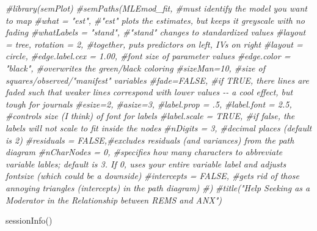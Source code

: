 \documentclass[
  english,
]{book}
\newenvironment{Shaded}{\begin{snugshade}}{\end{snugshade}}
\newcommand{\CommentTok}[1]{\textcolor[rgb]{0.56,0.35,0.01}{\textit{#1}}}
\newcommand{\FunctionTok}[1]{\textcolor[rgb]{0.00,0.00,0.00}{#1}}
\newcommand{\NormalTok}[1]{#1}
\begin{document}
\begin{Shaded}
\begin{Highlighting}[]
\CommentTok{\#library(semPlot)}
\CommentTok{\#semPaths(MLEmod\_fit, \#must identify the model you want to map}
        \CommentTok{\#what = "est", \#"est" plots the estimates, but keeps it greyscale with no fading}
         \CommentTok{\#whatLabels = "stand", \#"stand" changes to standardized values}
         \CommentTok{\#layout = \textquotesingle{}tree\textquotesingle{}, rotation = 2, \#together, puts predictors on left, IVs on right }
         \CommentTok{\#layout = \textquotesingle{}circle\textquotesingle{},}
         \CommentTok{\#edge.label.cex = 1.00, \#font size of parameter values}
         \CommentTok{\#edge.color = "black", \#overwrites the green/black coloring}
         \CommentTok{\#sizeMan=10, \#size of squares/observed/"manifest" variables}
         \CommentTok{\#fade=FALSE, \#if TRUE, there lines are faded such that weaker lines correspond with lower values {-}{-} a cool effect, but tough for journals}
         \CommentTok{\#esize=2, }
         \CommentTok{\#asize=3,}
         \CommentTok{\#label.prop = .5,}
         \CommentTok{\#label.font = 2.5, \#controls size (I think) of font for labels}
         \CommentTok{\#label.scale = TRUE, \#if false, the labels will not scale to fit inside the nodes}
         \CommentTok{\#nDigits = 3, \#decimal places (default is 2)}
         \CommentTok{\#residuals = FALSE,\#excludes residuals (and variances) from the path diagram}
         \CommentTok{\#nCharNodes = 0, \#specifies how many characters to abbreviate variable lables; default is 3.  If 0, uses your entire variable label and adjusts fontsize (which could be a downside)}
         \CommentTok{\#intercepts = FALSE, \#gets rid of those annoying triangles (intercepts) in the path diagram)}
\CommentTok{\#)}
\CommentTok{\#title("Help Seeking as a Moderator in the Relationship between REMS and ANX")}
\end{Highlighting}
\end{Shaded}

\begin{Shaded}
\begin{Highlighting}[]
\FunctionTok{sessionInfo}\NormalTok{()}
\end{Highlighting}
\end{Shaded}
\end{document}
